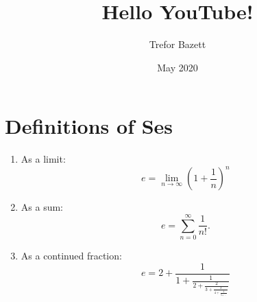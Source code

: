 \documentclass{article}
\title{Hello YouTube!}
\author{Trefor Bazett}
\date{May 2020}
\begin{document}
\maketitle
\section{Definitions of Ses}
\begin{enumerate}
    \item As a limit:
          \[e= \lim_{n\to\infty} \left(1+\frac{1}{n}\right)^n\]
    \item As a sum:
          \[e=\sum_{n=0}^{\infty} \frac{1}{n!}.\]
    \item As a continued fraction:
          \[e=2+\frac{1}{1+\frac{1}{2+\frac{2}{3+\frac{3}{4+\frac{4}{5+\ddots}}}}}\]
\end{enumerate}
\end{document}

